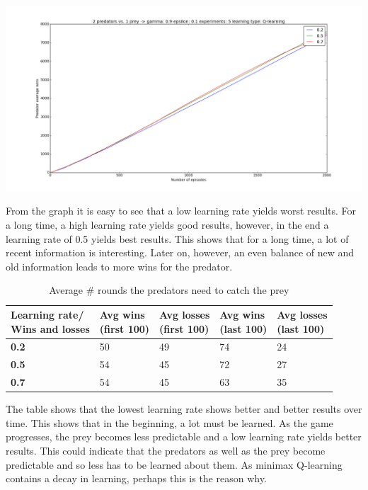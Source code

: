 \begin{center}
	\includegraphics[scale=0.3]{2_predators_learning_rate_q_learning}
\end{center}

From the graph it is easy to see that a low learning rate yields worst results. For a long time, a high learning rate yields good results, however, in the end a learning rate of 0.5 yields best results. This shows that for a long time, a lot of recent information is interesting.  Later on, however, an even balance of new and old information leads to more wins for the predator. 

\begin{table}[H]
\begin{center}
\begin{tabular}{| l | l | l | l | l |}
\hline
\parbox{2cm}{Learning rate/ \\ Wins and losses} & \parbox{2cm}{\textbf{Avg wins \\ (first 100)}} & \parbox{2cm}{\textbf{Avg losses \\ (first 100)}} & \parbox{2cm}{\textbf{Avg wins \\ (last 100)}} & \parbox{2cm}{\textbf{Avg losses \\ (last 100)}} \\
\hline
\textbf{0.2} & 50 & 49 & 74 & 24 \\
\hline
\textbf{0.5} & 54 & 45 & 72 & 27 \\
\hline
\textbf{0.7} & 54 & 45 & 63 & 35 \\
\hline
\end{tabular}
\caption{Average \# rounds the predators need to catch the prey}
\end{center}
\end{table}

The table shows that the lowest learning rate shows better and better results over time. This shows that in the beginning, a lot must be learned. As the game progresses, the prey becomes less predictable and a low learning rate yields better results. This could indicate that the predators as well as the prey become predictable and so less has to be learned about them. As minimax Q-learning contains a decay in learning, perhaps this is the reason why. %

